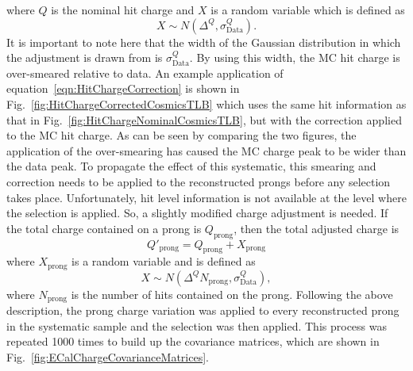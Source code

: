 where $Q$ is the nominal hit charge and $X$ is a random variable which is defined as 
\begin{equation}
X \sim N(\Delta^{Q},\sigma_{\textrm{Data}}^Q).
\label{eqn:HitChargeRandomVariable}
\end{equation}
It is important to note here that the width of the Gaussian distribution in which the adjustment is drawn from is $\sigma_{\textrm{Data}}^Q$.  By using this width, the MC hit charge is over-smeared relative to data.  An example application of equation~\ref{eqn:HitChargeCorrection} is shown in Fig.~\ref{fig:HitChargeCorrectedCosmicsTLB} which uses the same hit information as that in Fig.~\ref{fig:HitChargeNominalCosmicsTLB}, but with the correction applied to the MC hit charge.  As can be seen by comparing the two figures, the application of the over-smearing has caused the MC charge peak to be wider than the data peak.  To propagate the effect of this systematic, this smearing and correction needs to be applied to the reconstructed prongs before any selection takes place.  Unfortunately, hit level information is not available at the level where the selection is applied.  So, a slightly modified charge adjustment is needed.  If the total charge contained on a prong is $Q_{\textrm{prong}}$, then the total adjusted charge is
\begin{equation}
Q'_{\textrm{prong}} = Q_{\textrm{prong}} + X_{\textrm{prong}}
\label{eqn:ProngChargeRandomVariable}
\end{equation}
where $X_{\textrm{prong}}$ is a random variable and is defined as
\begin{equation}
X \sim N(\Delta^{Q}N_{\textrm{prong}},\sigma_{\textrm{Data}}^Q),
\label{eqn:HitChargeRandomVariable}
\end{equation}
where $N_{\textrm{prong}}$ is the number of hits contained on the prong.  Following the above description, the prong charge variation was applied to every reconstructed prong in the systematic sample and the selection was then applied.  This process was repeated 1000 times to build up the covariance matrices, which are shown in Fig.~\ref{fig:ECalChargeCovarianceMatrices}.
